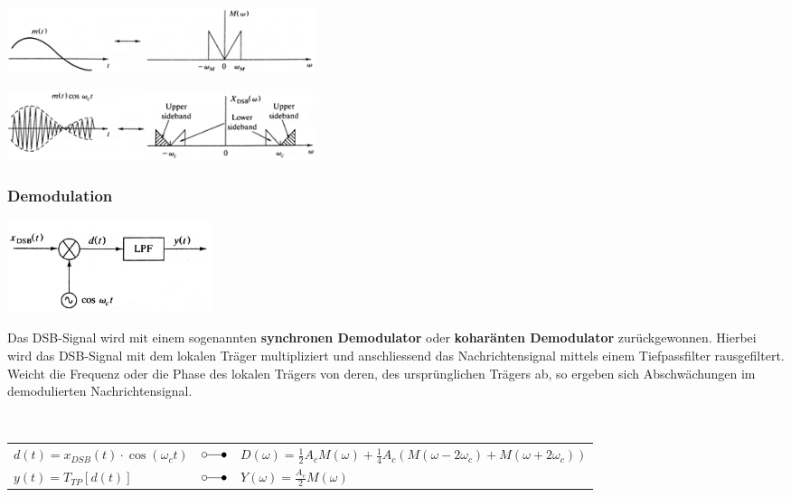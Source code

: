 \begin{minipage}[t]{9.5cm}
    \includegraphics[width=9cm]{bilder/am_dsb_nachrichtensignal.png}
\end{minipage}
\begin{minipage}[t]{9cm}
    \includegraphics[width=9cm]{bilder/am_dsb_spektrum.png}
\end{minipage}

\subsubsection{Demodulation} 
\label{am_dsb_modulation}
\begin{minipage}[t][2.3cm][c]{6.5cm}
    \includegraphics[width=6cm]{bilder/am_dsb_demodulation.png}
\end{minipage}
\begin{minipage}[t][2.3cm][c]{11.5cm}
	Das DSB-Signal wird mit einem sogenannten \textbf{synchronen Demodulator} oder \textbf{koharänten
	Demodulator} zurückgewonnen. Hierbei wird das DSB-Signal mit dem lokalen Träger
	multipliziert und anschliessend das Nachrichtensignal mittels einem Tiefpassfilter rausgefiltert.
	\\ Weicht die Frequenz oder die Phase des lokalen Trägers von deren, des ursprünglichen Trägers ab, 
	so ergeben sich Abschwächungen im demodulierten Nachrichtensignal.
\end{minipage} \\

\begin{tabular}{l l l}
	$d(t) = x_{DSB}(t) \cdot \cos(\omega_ct)$ & $\laplace$ &  
	$D(\omega) = \frac{1}{2} A_c M(\omega) + \frac{1}{4} A_c (M(\omega-2\omega_c) + M(\omega+2\omega_c))$ \\
	$y(t) = T_{TP}[d(t)] $&$ \laplace $&$ Y(\omega) = \frac{A_c}{2} M(\omega)$ \\
\end{tabular} \\

